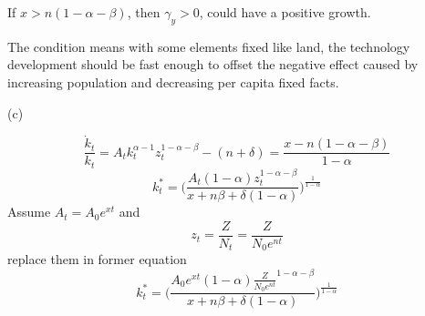 \documentclass[letterpaper, 11pt]{article}
\newcommand{\1}{\mathds{1}}	%
\theoremstyle{definition}
\begin{document}
If $x > n(1-\alpha-\beta)$, then $\gamma_y > 0$, could have a positive growth.

The condition means with some elements fixed like land, the technology development should be fast enough to offset the negative effect caused by increasing population and decreasing per capita fixed facts.


(c)

\[
  \frac{\dot{k}_t}{k_t} = A_t k_t^{\alpha-1}z_t^{1-\alpha-\beta} - (n+\delta) = \frac{x - n(1-\alpha-\beta)}{1-\alpha}
\]
\[
  k^*_t = \Big(\frac{A_t(1-\alpha)z_t^{1-\alpha-\beta}}{x + n \beta + \delta(1-\alpha)}\Big)^{\frac{1}{1-\alpha}}
\]
Assume $A_t = A_0 e^{xt}$ and \[
  z_t = \frac{Z}{N_t} = \frac{Z}{N_0e^{nt}}
\] replace them in former equation \[
  k^*_t = \Big(\frac{A_0 e^{xt}(1-\alpha){\frac{Z}{N_0e^{nt}}}^{1-\alpha-\beta}}{x + n \beta + \delta(1-\alpha)}\Big)^{\frac{1}{1-\alpha}}
\]


\end{document}
